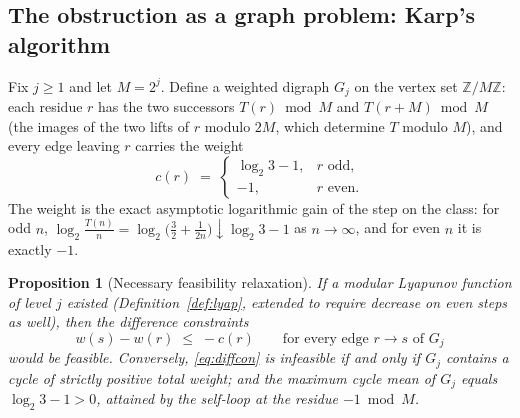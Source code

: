 \documentclass[11pt]{amsart}
\newtheorem{proposition}[theorem]{Proposition}
\theoremstyle{definition}
\theoremstyle{remark}
\newcommand{\Z}{\mathbb{Z}}
\begin{document}
\subsection{The obstruction as a graph problem: Karp's algorithm}\label{sec:karp}

Fix $j \ge 1$ and let $M = 2^j$. Define a weighted digraph $G_j$ on the vertex set $\Z/M\Z$: each residue $r$ has the two successors $T(r) \bmod M$ and $T(r + M) \bmod M$ (the images of the two lifts of $r$ modulo $2M$, which determine $T$ modulo $M$), and every edge leaving $r$ carries the weight
\[
c(r) \;=\; \begin{cases} \log_2 3 - 1, & r \text{ odd},\\ -1, & r \text{ even}. \end{cases}
\]
The weight is the exact asymptotic logarithmic gain of the step on the class: for odd $n$, $\log_2\frac{T(n)}{n} = \log_2\bigl(\frac32 + \frac{1}{2n}\bigr) \downarrow \log_2 3 - 1$ as $n \to \infty$, and for even $n$ it is exactly $-1$.

\begin{proposition}[Necessary feasibility relaxation]\label{prop:karpfeas}
If a modular Lyapunov function of level $j$ existed (Definition~\ref{def:lyap}, extended to require decrease on even steps as well), then the difference constraints
\begin{equation}\label{eq:diffcon}
w(s) - w(r) \;\le\; -c(r) \qquad \text{for every edge } r \to s \text{ of } G_j
\end{equation}
would be feasible. Conversely, \eqref{eq:diffcon} is infeasible if and only if $G_j$ contains a cycle of strictly positive total weight; and the maximum cycle mean of $G_j$ equals $\log_2 3 - 1 > 0$, attained by the self-loop at the residue $-1 \bmod M$.
\end{proposition}
\end{document}
